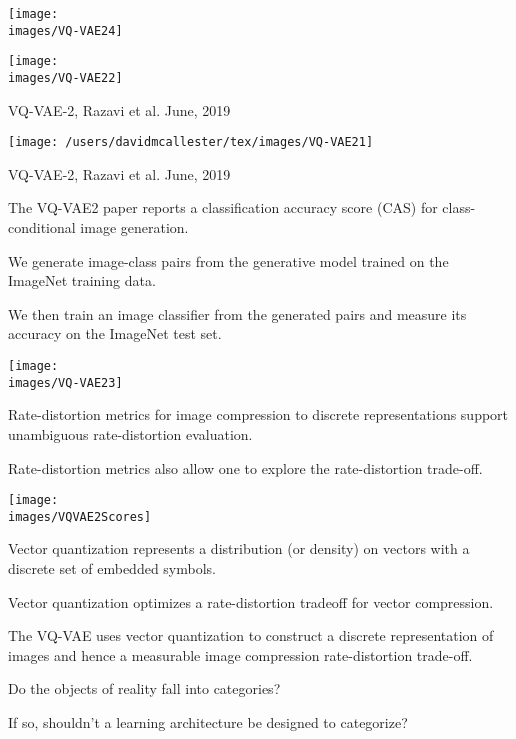 {
\centerline{\texttt{[image: \\images/VQ-VAE24]}}


\centerline{\texttt{[image: \\images/VQ-VAE22]}}

\vfill
VQ-VAE-2, Razavi et al. June, 2019


\centerline{\texttt{[image: /users/davidmcallester/tex/images/VQ-VAE21]}}

\vfill
VQ-VAE-2, Razavi et al. June, 2019


The VQ-VAE2 paper reports a classification accuracy score (CAS) for class-conditional image generation.

\vfill
We generate image-class pairs from the generative model trained on the ImageNet training data.

\vfill
We then train an image classifier from the generated pairs and measure its accuracy on the ImageNet test set.

\vfill
\centerline{\texttt{[image: \\images/VQ-VAE23]}}


Rate-distortion metrics for image compression to discrete representations support unambiguous rate-distortion evaluation.

\vfill
Rate-distortion metrics also allow one to explore the rate-distortion trade-off.

\vfill
\centerline{\texttt{[image: \\images/VQVAE2Scores]}}


Vector quantization represents a distribution (or density) on vectors with a discrete set of embedded symbols.

\vfill
Vector quantization optimizes a rate-distortion tradeoff for vector compression.

\vfill
The VQ-VAE uses vector quantization to construct a discrete representation of images and hence a measurable image compression rate-distortion trade-off.


Do the objects of reality fall into categories?

\vfill
If so, shouldn't a learning architecture be designed to categorize?

}
